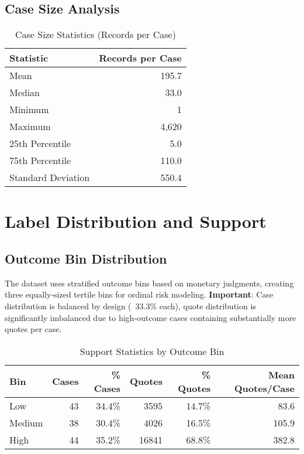 \documentclass[11pt]{article}
\begin{document}
\subsection{Case Size Analysis}

\begin{table}[H]
\centering
\caption{Case Size Statistics (Records per Case)}
\begin{tabular}{lr}
\toprule
\textbf{Statistic} & \textbf{Records per Case} \\
\midrule
Mean & 195.7 \\
Median & 33.0 \\
Minimum & 1 \\
Maximum & 4,620 \\
25th Percentile & 5.0 \\
75th Percentile & 110.0 \\
Standard Deviation & 550.4 \\
\bottomrule
\end{tabular}
\end{table}

\section{Label Distribution and Support}

\subsection{Outcome Bin Distribution}

The dataset uses stratified outcome bins based on monetary judgments, creating three equally-sized tertile bins for ordinal risk modeling. \textbf{Important}: Case distribution is balanced by design (~33.3\% each), quote distribution is significantly imbalanced due to high-outcome cases containing substantially more quotes per case.

\begin{table}[H]
\centering
\caption{Support Statistics by Outcome Bin}
\begin{tabular}{lrrrrr}
\toprule
\textbf{Bin} & \textbf{Cases} & \textbf{\% Cases} & \textbf{Quotes} & \textbf{\% Quotes} & \textbf{Mean Quotes/Case} \\
\midrule
Low & 43 & 34.4\% & 3595 & 14.7\% & 83.6 \\
Medium & 38 & 30.4\% & 4026 & 16.5\% & 105.9 \\
High & 44 & 35.2\% & 16841 & 68.8\% & 382.8 \\

\bottomrule
\end{tabular}
\end{table}
\end{document}
